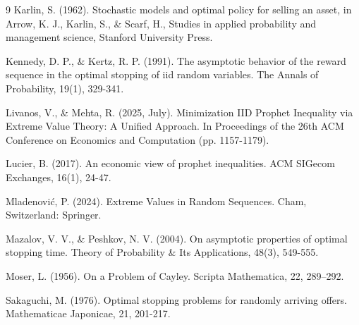 \documentclass{article}
\numberwithin{equation}{section}
\begin{document}
\begin{thebibliography}{9}
	Karlin, S. (1962). Stochastic models and optimal policy for selling an asset, in
	Arrow, K. J., Karlin, S., \& Scarf, H., Studies in applied probability and management science, Stanford University Press.
	
	Kennedy, D. P., \& Kertz, R. P. (1991). The asymptotic behavior of the reward sequence in the optimal stopping of iid random variables. The Annals of Probability, 19(1), 329-341.
	
	Livanos, V., \& Mehta, R. (2025, July). Minimization IID Prophet Inequality via Extreme Value Theory: A Unified Approach. In Proceedings of the 26th ACM Conference on Economics and Computation (pp. 1157-1179).
	
	Lucier, B. (2017). An economic view of prophet inequalities. ACM SIGecom Exchanges, 16(1), 24-47.
	
	Mladenovi\'c, P. (2024). Extreme Values in Random Sequences. Cham, Switzerland: Springer.
	
	Mazalov, V. V., \& Peshkov, N. V. (2004). On asymptotic properties of optimal stopping time. Theory of Probability \& Its Applications, 48(3), 549-555.
	
	Moser, L. (1956). On a Problem of Cayley. Scripta Mathematica, 22, 289–292.
	
	Sakaguchi, M. (1976). Optimal stopping problems for randomly arriving offers. Mathematicae Japonicae, 21, 201-217.
	
	
	
\end{thebibliography}
\end{document}
